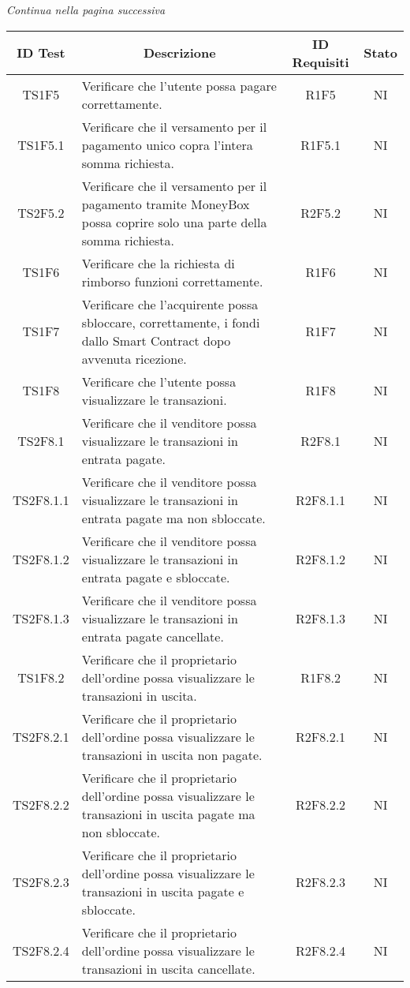 \begin{center}
  \textit{\small Continua nella pagina successiva}
\end{center}
\begin{table}[H]
  \centering
  \renewcommand{\arraystretch}{1.8}
  \begin{tabular}{c|p{8cm}|c|c}
    \rowcolor[HTML]{125E28}
    \color[HTML]{FFFFFF}\textbf{ID Test}
    & \multicolumn{1}{c}{\color[HTML]{FFFFFF}\textbf{Descrizione}}
    & \color[HTML]{FFFFFF}\textbf{ID Requisiti}
    & \color[HTML]{FFFFFF}\textbf{Stato}\\
    \hline
    TS1F5 &	Verificare che l'utente possa pagare correttamente. &	R1F5 &	NI \\
    TS1F5.1 &	Verificare che il versamento per il pagamento unico copra l'intera somma richiesta. &	R1F5.1 &	NI \\
    TS2F5.2 &	Verificare che il versamento per il pagamento tramite MoneyBox possa coprire solo una parte della somma richiesta. &	R2F5.2 &	NI \\
    TS1F6 &	Verificare che la richiesta di rimborso funzioni correttamente. &	R1F6 &	NI \\
    TS1F7 &	Verificare che l'acquirente possa sbloccare, correttamente, i fondi dallo Smart Contract dopo avvenuta ricezione. &	R1F7 &	NI \\
    TS1F8 &	Verificare che l'utente possa visualizzare le transazioni. &	R1F8 &	NI \\
    TS2F8.1 &	Verificare che il venditore possa visualizzare le transazioni in entrata pagate. & R2F8.1 &	NI \\
    TS2F8.1.1 & Verificare che il venditore possa visualizzare le transazioni in entrata pagate ma non sbloccate. & R2F8.1.1 &	NI \\
    TS2F8.1.2 & Verificare che il venditore possa visualizzare le transazioni in entrata pagate e sbloccate. & R2F8.1.2 &	NI \\
    TS2F8.1.3 & Verificare che il venditore possa visualizzare le transazioni in entrata pagate cancellate. & R2F8.1.3 &	NI \\
    TS1F8.2 &	Verificare che il proprietario dell'ordine possa visualizzare le transazioni in uscita. &	R1F8.2 & NI \\
    TS2F8.2.1 &	Verificare che il proprietario dell'ordine possa visualizzare le transazioni in uscita non pagate. & R2F8.2.1 &	NI \\
    TS2F8.2.2 &	Verificare che il proprietario dell'ordine possa visualizzare le transazioni in uscita pagate ma non sbloccate. &	R2F8.2.2 &	NI \\
    TS2F8.2.3 &	Verificare che il proprietario dell'ordine possa visualizzare le transazioni in uscita pagate e sbloccate. & R2F8.2.3 &	NI \\
    TS2F8.2.4 &	Verificare che il proprietario dell'ordine possa visualizzare le transazioni in uscita cancellate. &	R2F8.2.4 &	NI \\
  \end{tabular}
\end{table}
